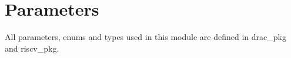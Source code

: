 \section{Parameters}
\label{chapter3}

All parameters, enums and types used in this module are defined in drac\_pkg and riscv\_pkg.